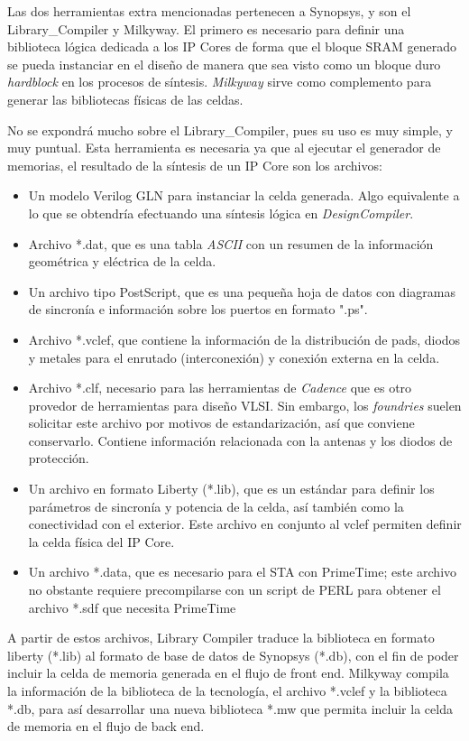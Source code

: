 Las dos herramientas extra mencionadas pertenecen a Synopsys, y son el Library\_Compiler y Milkyway. El primero es necesario para definir una biblioteca lógica dedicada a los IP Cores de forma que el bloque SRAM generado se pueda instanciar en el diseño de manera que sea visto como un bloque duro \textit{hardblock} en los procesos de síntesis. \textit{Milkyway} sirve como complemento para generar las bibliotecas físicas de las celdas.

No se expondrá mucho sobre el Library\_Compiler, pues su uso es muy simple, y muy puntual. Esta herramienta es necesaria ya que al ejecutar el generador de memorias, el resultado de la síntesis de un IP Core son los archivos:
\begin{itemize}
\item Un modelo Verilog GLN para instanciar la celda generada. Algo equivalente a lo que se obtendría efectuando una síntesis lógica en \textit{DesignCompiler}.
\item Archivo *.dat, que es una tabla \textit{ASCII} con un resumen de la información geométrica y eléctrica de la celda.
\item Un archivo tipo PostScript, que es una pequeña hoja de datos con diagramas de sincronía e información sobre los puertos en formato ".ps".
\item Archivo *.vclef, que contiene la información de la distribución de pads, diodos y metales para el enrutado (interconexión) y conexión externa en la celda.
\item Archivo *.clf, necesario para las herramientas de \textit{Cadence} que es otro provedor de herramientas para diseño VLSI.  Sin embargo, los \textit{foundries} suelen solicitar este archivo por motivos de estandarización, así que conviene conservarlo. Contiene información relacionada con la antenas y los diodos de protección.
\item Un archivo en formato Liberty (*.lib), que es un estándar para definir los parámetros de sincronía y potencia de la celda, así también como la conectividad con el exterior. Este archivo en conjunto al vclef permiten definir la celda física del IP Core.
\item Un archivo *.data, que es necesario para el STA con PrimeTime; este archivo no obstante requiere precompilarse con un script de PERL para obtener el archivo *.sdf que necesita PrimeTime
\end{itemize}

A partir de estos archivos, Library Compiler traduce la biblioteca en formato liberty (*.lib) al formato de base de datos de Synopsys (*.db), con el fin de poder incluir la celda de memoria generada en el flujo de front end. Milkyway compila la información de la biblioteca de la tecnología, el archivo *.vclef y la biblioteca *.db, para así desarrollar una nueva biblioteca *.mw que permita incluir la celda de memoria en el flujo de back end.

